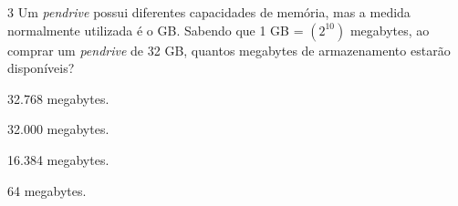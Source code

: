 








\num{3} Um \textit{pendrive} possui diferentes capacidades de memória, mas a medida
normalmente utilizada é o GB. Sabendo que 1 GB = $(2^{10})$ megabytes,
ao comprar um \textit{pendrive} de 32 GB, quantos megabytes de armazenamento
estarão disponíveis?

\begin{escolha}[itemsep=0pt]
\item 32.768 megabytes.
\item 32.000 megabytes.
\item 16.384 megabytes.
\item 64 megabytes.
\end{escolha}







